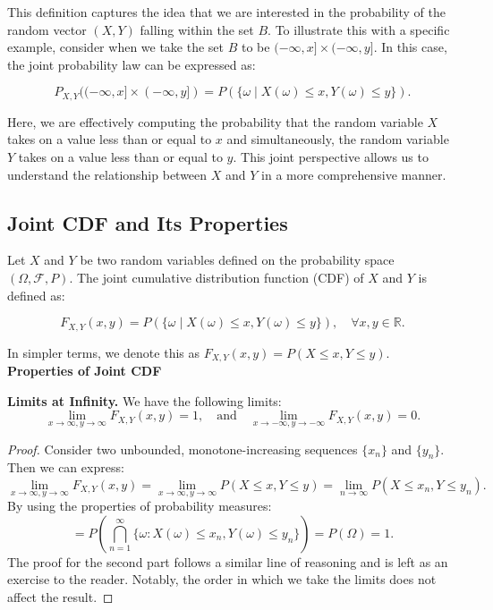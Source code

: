 This definition captures the idea that we are interested in the probability of the random vector \((X, Y)\) falling within the set \(B\). To illustrate this with a specific example, consider when we take the set \(B\) to be \((-\infty, x] \times (-\infty, y]\). In this case, the joint probability law can be expressed as:

\[
P_{X,Y}((-\infty, x] \times (-\infty, y]) = P(\{\omega \mid X(\omega) \leq x, Y(\omega) \leq y\}).
\]

Here, we are effectively computing the probability that the random variable \(X\) takes on a value less than or equal to \(x\) and simultaneously, the random variable \(Y\) takes on a value less than or equal to \(y\). This joint perspective allows us to understand the relationship between \(X\) and \(Y\) in a more comprehensive manner.

\subsection{Joint CDF and Its Properties}

\begin{definition}
    Let \( X \) and \( Y \) be two random variables defined on the probability space \( (\Omega, \mathcal{F}, P) \). The joint cumulative distribution function (CDF) of \( X \) and \( Y \) is defined as:

\[
F_{X,Y}(x,y) = P(\{\omega \mid X(\omega) \leq x, Y(\omega) \leq y\}), \quad \forall x,y \in \mathbb{R}.
\]
\end{definition}

In simpler terms, we denote this as \( F_{X,Y}(x,y) = P(X \leq x, Y \leq y) \).\\

\textbf{Properties of Joint CDF}\\

\begin{lemma}
    \textbf{Limits at Infinity.} We have the following limits:
    \[
    \lim_{x \to \infty, y \to \infty} F_{X,Y}(x,y) = 1, \quad \text{and} \quad \lim_{x \to -\infty, y \to -\infty} F_{X,Y}(x,y) = 0.
    \]
\end{lemma}

\begin{proof}
    Consider two unbounded, monotone-increasing sequences \( \{x_n\} \) and \( \{y_n\} \). Then we can express:
   \[
   \lim_{x \to \infty, y \to \infty} F_{X,Y}(x,y) = \lim_{x \to \infty, y \to \infty} P(X \leq x, Y \leq y) = \lim_{n \to \infty} P(X \leq x_n, Y \leq y_n).
   \]
   By using the properties of probability measures:
   \[
   = P\left(\bigcap_{n=1}^{\infty} \{\omega : X(\omega) \leq x_n, Y(\omega) \leq y_n\}\right) = P(\Omega) = 1.
   \]
   The proof for the second part follows a similar line of reasoning and is left as an exercise to the reader. Notably, the order in which we take the limits does not affect the result.
\end{proof}

